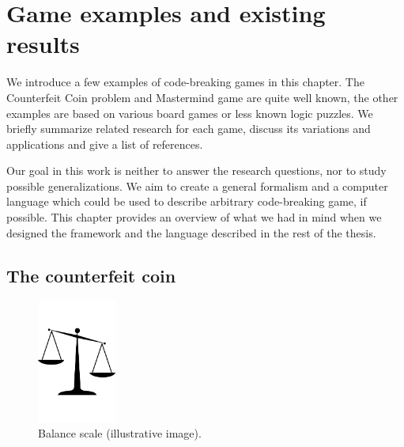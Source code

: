 \chapter[Examples of code-breaking games and existing results]{Game examples and existing results}
\label{ch:games}
We introduce a few examples of code-breaking games in this chapter.
The Counterfeit Coin problem and Mastermind game are quite well known,
  the other examples are based on various board games or less known
  logic puzzles.
We briefly summarize related research for each game, discuss
  its variations and applications and give a list of
  references.

Our goal in this work is neither to answer the research questions, nor
  to study possible generalizations.
We aim to create a general formalism and a computer language which could
  be used to describe arbitrary code-breaking game, if possible.
This chapter provides an overview of what we had in mind
  when we designed the framework and the language described
  in the rest of the thesis.

\section{The counterfeit coin} \label{s:coins}

\begin{figure}
  \begin{center}
  \vspace{-5mm}
  \includegraphics[width=0.23\textwidth]{pictures/scales.pdf}
  \vspace{-5mm}
  \end{center}
  \caption{Balance scale (illustrative image)\protect\footnotemark.}
  \vspace{-10mm}
\end{figure}


